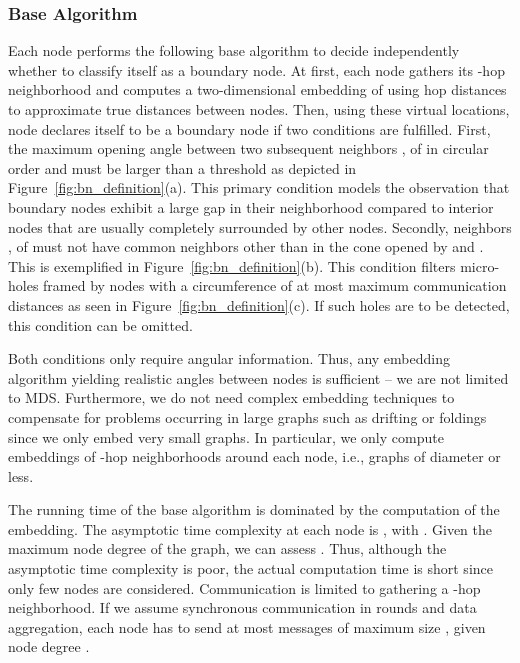 \documentclass{llncs}
\begin{document}
\subsubsection{Base Algorithm}
Each node performs the following base algorithm to decide independently whether to classify itself as a boundary node.
At first, each node  gathers its -hop neighborhood  and computes a two-dimensional embedding of  using hop distances to approximate true distances between nodes.
Then, using these virtual locations, node  declares itself to be a boundary node if two conditions are fulfilled.
First, the maximum opening angle  between two subsequent neighbors ,  of  in circular order and  must be larger than a threshold  as depicted in Figure~\ref{fig:bn_definition}(a).
This primary condition models the observation that boundary nodes exhibit a large gap in their neighborhood compared to interior nodes that are usually completely surrounded by other nodes.
Secondly, neighbors ,  of  must not have common neighbors other than  in the cone opened by  and .
This is exemplified in Figure~\ref{fig:bn_definition}(b).
This condition filters micro-holes framed by  nodes with a circumference of at most  maximum communication distances as seen in Figure~\ref{fig:bn_definition}(c).
If such holes are to be detected, this condition can be omitted.

Both conditions only require angular information.
Thus, any embedding algorithm yielding realistic angles between nodes is sufficient -- we are not limited to MDS.
Furthermore, we do not need complex embedding techniques to compensate for problems occurring in large graphs such as drifting or foldings since we only embed very small graphs.
In particular, we only compute embeddings of -hop neighborhoods around each node, i.e., graphs of diameter  or less.

The running time of the base algorithm is dominated by the computation of the embedding.
The asymptotic time complexity at each node  is , with .
Given the maximum node degree  of the graph, we can assess  \cite{pg-fdwcd-04}.
Thus, although the asymptotic time complexity is poor, the actual computation time is short since only few nodes are considered.
Communication is limited to gathering a -hop neighborhood.
If we assume synchronous communication in rounds and data aggregation, each node has to send at most  messages of maximum size , given node degree .
\end{document}
